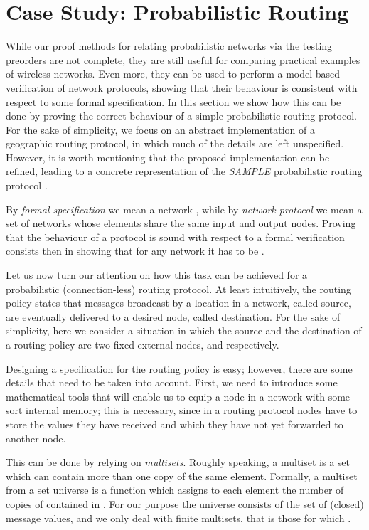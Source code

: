 \documentclass{LMCS}
\begin{document}
\section{Case Study: Probabilistic Routing}
\label{sec:prob.routing}
While our proof methods for relating probabilistic networks 
via the testing preorders are not complete, they are still 
useful for comparing practical examples of wireless networks. 
Even more, they can be used to perform a model-based verification
of network protocols, showing that their behaviour 
is consistent with respect to some formal specification. 
In this section we show how this can be done by proving the 
correct behaviour of a simple probabilistic routing protocol. 
For the sake of simplicity, we focus on an abstract implementation of 
a geographic routing protocol, in which much of the details are left 
unspecified. However, it is worth mentioning that 
the proposed implementation can be refined, leading to a concrete 
representation of the  \emph{SAMPLE} probabilistic routing protocol \cite{sample}.

By \emph{formal specification} we mean a network , while by \emph{network protocol} 
we mean a set of networks  whose elements share the same input and output nodes.
Proving that the behaviour of a protocol  is sound with respect 
to a formal verification  consists then in showing that 
for any network  it has to be 
.

Let us now turn our attention on how this task can be achieved 
for a probabilistic (connection-less) routing protocol. 
At least intuitively, the routing policy states that 
messages broadcast by a location in a network, 
called source, are 
eventually delivered to a desired node, called 
destination. 
For the sake of simplicity, here we consider a 
situation in which the source and the destination 
of a routing policy are two fixed external nodes, 
 and  respectively. 

Designing a specification for the routing policy is 
easy; however, there are some details that need to be 
taken into account. 
First, we need to introduce some mathematical 
tools that will enable us to equip a node in a 
network with some sort internal memory; this is necessary, 
since in a routing protocol nodes have to store 
the values they have received and which they 
have not yet forwarded to another 
node.

This can be done by relying on \emph{multisets}. 
Roughly speaking, a multiset  
is a set which can contain more than one copy of 
the same element. Formally, a multiset 
 from a set universe  is 
a function  
which assigns to each element  the 
number of copies of  contained in . 
For our purpose the universe  consists of the 
set of (closed) message values, and we only deal with 
finite multisets, that is those for which 
.
\end{document}
